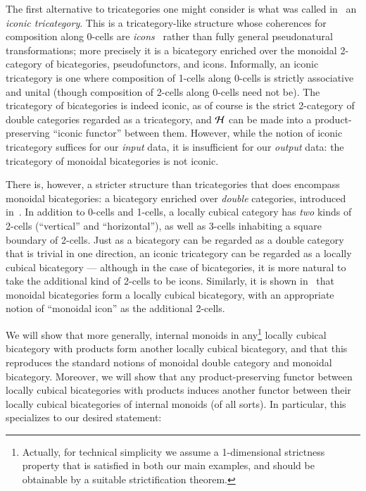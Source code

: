 The first alternative to tricategories one might consider is what was called in~\cite{shulman:psalg} an \emph{iconic tricategory}.
This is a tricategory-like structure whose coherences for composition along 0-cells are \emph{icons}~\cite{lack:icons} rather than fully general pseudonatural transformations; more precisely it is a bicategory enriched over the monoidal 2-category of bicategories, pseudofunctors, and icons.
Informally, an iconic tricategory is one where composition of 1-cells along 0-cells is strictly associative and unital (though composition of 2-cells along 0-cells need not be).
The tricategory of bicategories is indeed iconic, as of course is the strict 2-category of double categories regarded as a tricategory, and $\mathcal{H}$ can be made into a product-preserving ``iconic functor'' between them.
However, while the notion of iconic tricategory suffices for our \emph{input} data, it is insufficient for our \emph{output} data: the tricategory of monoidal bicategories is not iconic.

There is, however, a stricter structure than tricategories that does encompass monoidal bicategories: a bicategory enriched over \emph{double} categories, introduced in~\cite{gg:ldstr-tricat}.
In addition to 0-cells and 1-cells, a locally cubical category has \emph{two} kinds of 2-cells (``vertical'' and ``horizontal''), as well as 3-cells inhabiting a square boundary of 2-cells.
Just as a bicategory can be regarded as a double category that is trivial in one direction, an iconic tricategory can be regarded as a locally cubical bicategory --- although in the case of bicategories, it is more natural to take the additional kind of 2-cells to be icons.
Similarly, it is shown in~\cite{gg:ldstr-tricat} that monoidal bicategories form a locally cubical bicategory, with an appropriate notion of ``monoidal icon'' as the additional 2-cells.

We will show that more generally, internal monoids in any\footnote{Actually, for technical simplicity we assume a 1-dimensional strictness property that is satisfied in both our main examples, and should be obtainable by a suitable strictification theorem.} locally cubical bicategory with products form another locally cubical bicategory, and that this reproduces the standard notions of monoidal double category and monoidal bicategory.
Moreover, we will show that any product-preserving functor between locally cubical bicategories with products induces another functor between their locally cubical bicategories of internal monoids (of all sorts).
In particular, this specializes to our desired statement:

